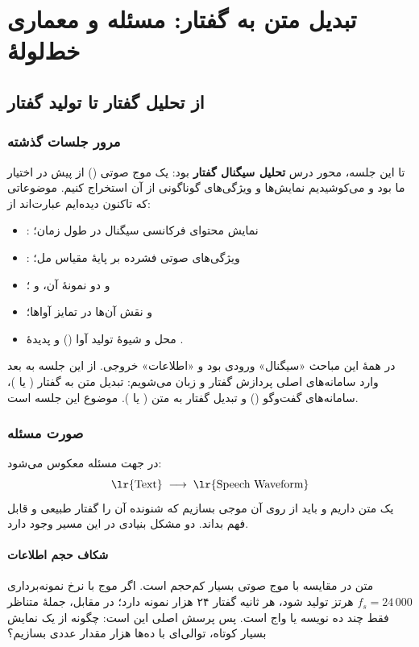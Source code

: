 \chapter{تبدیل متن به گفتار: مسئله و معماری خط‌لولهٔ }

\section{از تحلیل گفتار تا تولید گفتار}

\subsection{مرور جلسات گذشته}
تا این جلسه، محور درس \textbf{تحلیل سیگنال گفتار} بود: یک موج صوتی () از پیش در اختیار ما بود و می‌کوشیدیم نمایش‌ها و ویژگی‌های گوناگونی از آن استخراج کنیم. موضوعاتی که تاکنون دیده‌ایم عبارت‌اند از:
\begin{itemize}
  \item {}: نمایش محتوای فرکانسی سیگنال در طول زمان؛
  \item {}: ویژگی‌های صوتی فشرده بر پایهٔ مقیاس مل؛
  \item {} و دو نمونهٔ آن،  و ؛
  \item {} و نقش آن‌ها در تمایز آواها؛
  \item محل و شیوهٔ تولید آوا () و پدیدهٔ .
\end{itemize}
در همهٔ این مباحث «سیگنال» ورودی بود و «اطلاعات» خروجی. از این جلسه به بعد وارد سامانه‌های اصلی پردازش گفتار و زبان می‌شویم: تبدیل متن به گفتار ( یا )، سامانه‌های گفت‌وگو () و تبدیل گفتار به متن ( یا ). موضوع این جلسه  است.

\subsection{صورت مسئله}
در  جهت مسئله معکوس می‌شود:
\[
\text{\lr{Text}} \;\longrightarrow\; \text{\lr{Speech Waveform}}
\]
یک متن داریم و باید از روی آن موجی بسازیم که شنونده آن را گفتار طبیعی و قابل فهم بداند. دو مشکل بنیادی در این مسیر وجود دارد.

\subsubsection{شکاف حجم اطلاعات}
متن در مقایسه با موج صوتی بسیار کم‌حجم است. اگر موج با نرخ نمونه‌برداری $f_s = 24\,000$ هرتز تولید شود، هر ثانیه گفتار ۲۴ هزار نمونه دارد؛ در مقابل، جملهٔ متناظر فقط چند ده نویسه یا واج است. پس پرسش اصلی این است: چگونه از یک نمایش بسیار کوتاه، توالی‌ای با ده‌ها هزار مقدار عددی بسازیم؟


